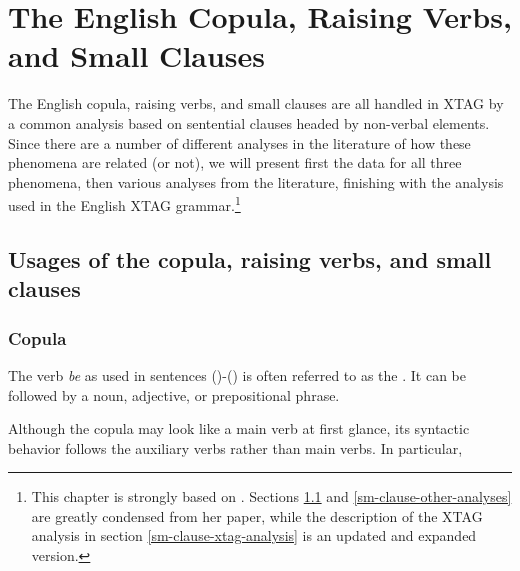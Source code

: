 \chapter{The English Copula, Raising Verbs, and Small Clauses}
\label{small-clauses}

The English copula, raising verbs, and small clauses are all handled in XTAG by
a common analysis based on sentential clauses headed by non-verbal elements.
Since there are a number of different analyses in the literature of how these
phenomena are related (or not), we will present first the data for all three
phenomena, then various analyses from the literature, finishing with the
analysis used in the English XTAG grammar.\footnote{This chapter is strongly
based on \cite{heycock91}.  Sections \ref{sm-clause-data} and
\ref{sm-clause-other-analyses} are greatly condensed from her paper, while the 
description of the XTAG analysis in section \ref{sm-clause-xtag-analysis} is an
updated and expanded version.}


\section{Usages of the copula, raising verbs, and small clauses}
\label{sm-clause-data}

\subsection{Copula}
\label{copula-data}

The verb {\it be} as used in sentences ({})-({}) is often
referred to as the .  It can be followed by a noun, adjective, or
prepositional phrase.


Although the copula may look like a main verb at first glance, its syntactic
behavior follows the auxiliary verbs rather than main verbs.  In particular,

